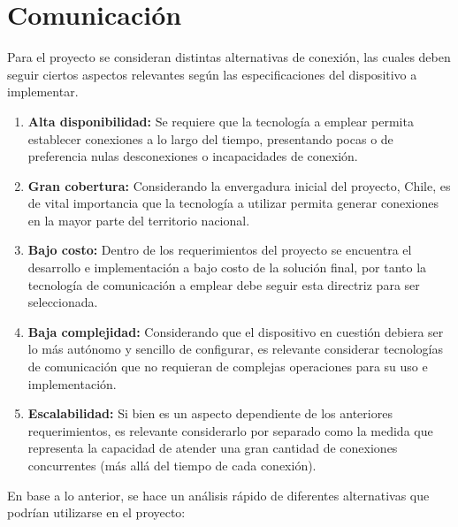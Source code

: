 \section{Comunicación}
Para el proyecto se consideran distintas alternativas de conexión, las cuales deben seguir ciertos aspectos relevantes según las especificaciones del dispositivo a implementar. 


\begin{enumerate}
	\item \textbf{Alta disponibilidad:}
	Se requiere que la tecnología a emplear permita establecer conexiones a lo largo del tiempo, presentando pocas o de preferencia nulas desconexiones o incapacidades de conexión.
	\item \textbf{Gran cobertura:}
	Considerando la envergadura inicial del proyecto, Chile, es de vital importancia que la tecnología a utilizar permita generar conexiones en la mayor parte del territorio nacional.
	\item \textbf{Bajo costo:}
	Dentro de los requerimientos del proyecto se encuentra el desarrollo e implementación a bajo costo de la solución final, por tanto la tecnología de comunicación a emplear debe seguir esta directriz para ser seleccionada.
	\item \textbf{Baja complejidad:}
	Considerando que el dispositivo en cuestión debiera ser lo más autónomo y sencillo de configurar, es relevante considerar tecnologías de comunicación que no requieran de complejas operaciones para su uso e implementación.
	\item \textbf{Escalabilidad:}
	Si bien es un aspecto dependiente de los anteriores requerimientos, es relevante considerarlo por separado como la medida que representa la capacidad de atender una gran cantidad de conexiones concurrentes (más allá del tiempo de cada conexión).
\end{enumerate}

En base a lo anterior, se hace un análisis rápido de diferentes alternativas que podrían utilizarse en el proyecto:


